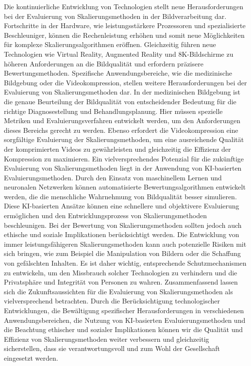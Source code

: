         Die kontinuierliche Entwicklung von Technologien stellt neue Herausforderungen bei der Evaluierung von Skalierungsmethoden in der Bildverarbeitung dar.
        Fortschritte in der Hardware, wie leistungsstärkere Prozessoren und spezialisierte Beschleuniger, können die Rechenleistung erhöhen und somit neue Möglichkeiten für komplexe Skalierungsalgorithmen eröffnen. Gleichzeitig führen neue Technologien wie Virtual Reality, Augmented Reality und 8K-Bildschirme zu höheren Anforderungen an die Bildqualität und erfordern präzisere Bewertungsmethoden.
        Spezifische Anwendungsbereiche, wie die medizinische Bildgebung oder die Videokompression, stellen weitere Herausforderungen bei der Evaluierung von Skalierungsmethoden dar. 
        In der medizinischen Bildgebung ist die genaue Beurteilung der Bildqualität von entscheidender Bedeutung für die richtige Diagnosestellung und Behandlungsplanung. 
        Hier müssen spezielle Metriken und Evaluierungsverfahren entwickelt werden, um den Anforderungen dieses Bereichs gerecht zu werden. 
        Ebenso erfordert die Videokompression eine sorgfältige Evaluierung der Skalierungsmethoden, um eine ausreichende Qualität der komprimierten Videos zu gewährleisten und gleichzeitig die Effizienz der Kompression zu maximieren.
        Ein vielversprechendes Potenzial für die zukünftige Evaluierung von Skalierungsmethoden liegt in der Anwendung von KI-basierten Evaluierungsmethoden. 
        Durch den Einsatz von maschinellem Lernen und neuronalen Netzwerken können automatisierte Bewertungsalgorithmen entwickelt werden, die die menschliche Wahrnehmung von Bildqualität besser simulieren. 
        Diese KI-basierten Ansätze können eine schnellere und objektivere Evaluierung ermöglichen und den Entwicklungsprozess von Skalierungsmethoden beschleunigen.
        Bei der Bewertung von Skalierungsmethoden sollten jedoch auch ethische und soziale Implikationen berücksichtigt werden. 
        Die Entwicklung von immer leistungsfähigeren Skalierungsmethoden kann auch potenzielle Risiken mit sich bringen, wie zum Beispiel die Manipulation von Bildern oder die Schaffung von gefälschten Inhalten. 
        Es ist daher wichtig, entsprechende Schutzmechanismen zu entwickeln, um den Missbrauch solcher Technologien zu verhindern und die Privatsphäre und Integrität von Personen zu wahren.
        Zusammenfassend lassen sich die Zukunftsaussichten für die Evaluierung von Skalierungsmethoden als vielversprechend betrachten. 
        Durch die Berücksichtigung technologischer Entwicklungen, die Bewältigung spezifischer Herausforderungen in verschiedenen Anwendungsbereichen, die Nutzung von KI-basierten Evaluierungsmethoden und die Beachtung ethischer und sozialer Implikationen können wir die Qualität und Effizienz von Skalierungsmethoden weiter verbessern und gleichzeitig sicherstellen, dass sie verantwortungsvoll und zum Wohl der Gesellschaft eingesetzt werden.
\newpage
